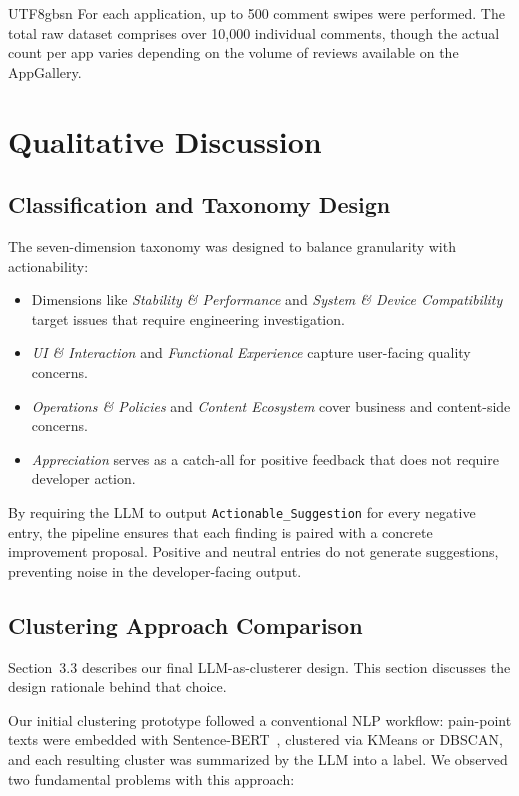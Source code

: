 \documentclass[11pt,a4paper]{article}
\begin{document}
\begin{CJK*}{UTF8}{gbsn}
For each application, up to 500 comment swipes were performed. The total raw dataset comprises over 10,000 individual comments, though the actual count per app varies depending on the volume of reviews available on the AppGallery.


\section{Qualitative Discussion}

\subsection{Classification and Taxonomy Design}

The seven-dimension taxonomy was designed to balance granularity with actionability:

\begin{itemize}[nosep]
  \item Dimensions like \textit{Stability \& Performance} and \textit{System \& Device Compatibility} target issues that require engineering investigation.
  \item \textit{UI \& Interaction} and \textit{Functional Experience} capture user-facing quality concerns.
  \item \textit{Operations \& Policies} and \textit{Content Ecosystem} cover business and content-side concerns.
  \item \textit{Appreciation} serves as a catch-all for positive feedback that does not require developer action.
\end{itemize}

By requiring the LLM to output \texttt{Actionable\_Suggestion} for every negative entry, the pipeline ensures that each finding is paired with a concrete improvement proposal. Positive and neutral entries do not generate suggestions, preventing noise in the developer-facing output.

\subsection{Clustering Approach Comparison}

Section~3.3 describes our final LLM-as-clusterer design. This section discusses the design rationale behind that choice.

Our initial clustering prototype followed a conventional NLP workflow: pain-point texts were embedded with Sentence-BERT~\cite{reimers19}, clustered via KMeans or DBSCAN, and each resulting cluster was summarized by the LLM into a label. We observed two fundamental problems with this approach:


\end{CJK*}
\end{document}
